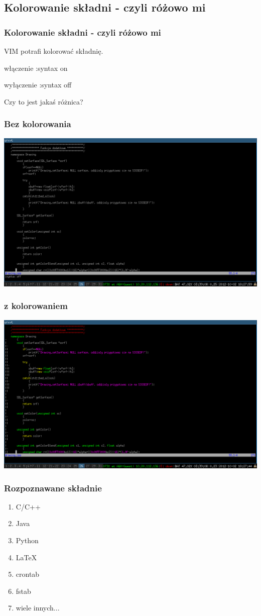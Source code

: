 \documentclass[10pt]{beamer}
\begin{document}
\subsection{Kolorowanie składni - czyli różowo mi}
\begin{frame}
	\frametitle{Kolorowanie składni - czyli różowo mi}
	{
		VIM potrafi kolorować składnię.
	}
	\uncover<2->
	{
		\begin{block}{włączenie}
		:syntax on
		\end{block}
	}
	{
		\begin{block}{wyłączenie}
		:syntax off
		\end{block}
	}
	{
		Czy to jest jakaś różnica?
	}
\end{frame}
\begin{frame}
	\frametitle{Bez kolorowania}
	\includegraphics[width=\textwidth]{syntax_off.png}
\end{frame}
\begin{frame}
	\frametitle{z kolorowaniem}
	\includegraphics[width=\textwidth]{syntax_on.png}
\end{frame}
\begin{frame}
	\frametitle{Rozpoznawane składnie}
	\begin{enumerate}[<+->]
	\item C/C++
	\item Java
	\item Python
	\item \LaTeX
	\item crontab
	\item fstab
	\item wiele innych...
	\end{enumerate}
\end{frame}
\end{document}
